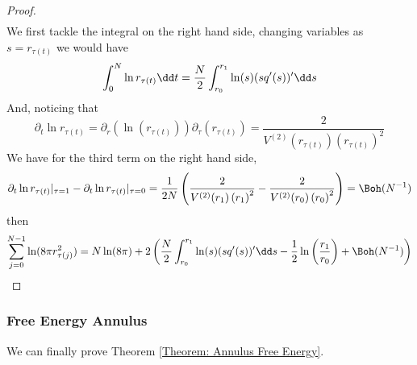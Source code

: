 \begin{proof}
\begin{multline}
	\end{multline}
	We first tackle the integral on the right hand side, changing variables as $s = r_{\tau(t)}$ we would have
	\begin{equation}
		\int_{0}^{N} \ln r_{\tau(t)} \dd t = \frac{N}{2} \int_{r_0}^{r_1} \ln(s) (s q'(s))' \dd s \\
	\end{equation}
	And, noticing that
	\begin{equation}
		\partial_t \ln r_{\tau(t)} =  \partial_r \left( \ln(r_{\tau(t)}) \right) \partial_\tau \left( r_{\tau(t)} \right) = \frac{2}{V^{(2)}(r_{\tau(t)}) \left( r_{\tau(t)} \right)^2}
	\end{equation}
	We have for the third term on the right hand side, 
	\begin{align}
		\partial_t \ln  r_{\tau(t)} |_{\tau=1} - \partial_t \ln  r_{\tau(t)}  |_{\tau=0}  = \frac{1}{2N} \left( \frac{2}{V^{(2)}(r_{1}) \left( r_{1} \right)^2} - \frac{2}{V^{(2)}(r_{0}) \left( r_{0} \right)^2} \right) = \Boh(N^{-1})
	\end{align}
	then
	\begin{equation}
		\sum_{j=0}^{N-1}  \ln(8\pi r^2_{\tau(j)}) = N \ln(8\pi) + 2 \left( \frac{N}{2} \int_{r_0}^{r_1} \ln(s) (s q'(s))' \dd s - \frac{1}{2} \ln\left(\frac{r_1}{r_0}\right) + \Boh(N^{-1}) \right) 
		\label{Equation: log(r) annulus}
	\end{equation}
	
\end{proof}

\subsubsection{Free Energy Annulus}

We can finally prove Theorem \ref{Theorem: Annulus Free Energy}.

